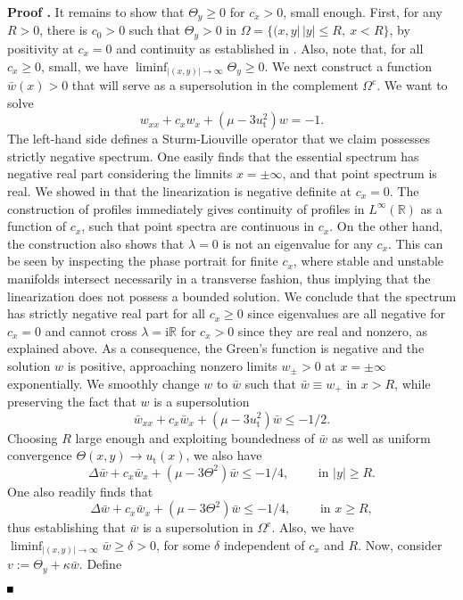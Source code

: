 \documentclass[10pt]{article}
\newenvironment{Proof}[1][\unskip]%
 {\begin{trivlist} \item[]{\bf Proof #1. }}%
 {\hspace*{\fill}$\rule{.4\baselineskip}{.4\baselineskip}$\end{trivlist}}
\newcommand{\R}{\mathbb{R}}
\newcommand{\rmi}{\mathrm{i}}
\renewcommand{\leq}{\leqslant}
\renewcommand{\geq}{\geqslant}
\begin{document}
\begin{Proof}
It remains to show that $\Theta_y\geq 0$ for $c_x>0$, small enough. First, for any $R>0$, there is $c_0>0$ such that $\Theta_y>0$ in $\Omega=\{(x,y|\,|y|\leq R,\ x<R\}$, by positivity at $c_x=0$ and continuity as established in \cite{Monteiro_Scheel}. Also, note that, for all $c_x\geq 0$, small, we have  $\liminf_{|(x,y)|\to\infty} \Theta_y \geq 0$. We next construct a function $\bar{w}(x)>0$ that will serve as a supersolution in the complement $\Omega^\mathrm{c}$. We want to solve 
\[
w_{xx}+c_xw_x+(\mu-3u_\mathrm{t}^2)w=-1.
\]
The left-hand side defines a Sturm-Liouville operator that we claim possesses strictly negative spectrum. One easily finds that the essential spectrum has negative real part considering the limnits $x=\pm\infty$, and that point spectrum is real. We showed in \cite{Monteiro_Scheel} that the linearization is negative definite at $c_x=0$. The construction of profiles immediately gives continuity of profiles in $L^\infty(\R)$ as a function of $c_x$, such that point spectra are continuous in $c_x$. On the other hand, the construction also shows that $\lambda=0$ is not an eigenvalue for any $c_x$. This can be seen by inspecting the phase portrait for finite $c_x$, where stable and unstable manifolds intersect necessarily in a transverse fashion, thus implying that the linearization does not possess a bounded solution.  We conclude that the spectrum has strictly negative real part for all $c_x\geq 0$ since eigenvalues are all negative for $c_x=0$ and cannot cross $\lambda=\rmi\R$ for $c_x>0$ since they are real and nonzero, as explained above. 
As a consequence, the Green's function is negative and the solution $w$ is positive, approaching  nonzero limits $w_\pm>0$ at $x=\pm\infty$ exponentially. We smoothly change $w$ to $\bar{w}$ such that  $\bar{w}\equiv w_+$ in $x>R$, while preserving the fact that $w$ is a supersolution
\[
\bar{w}_{xx}+c_x\bar{w}_x+(\mu-3u_\mathrm{t}^2)\bar{w}\leq -1/2.
\]
Choosing $R$ large enough and exploiting boundedness of $\bar{w}$ as well as uniform convergence $\Theta(x,y)\to u_\mathrm{t}(x)$, we also have 
\[
\Delta\bar{w}+c_x\bar{w}_x+(\mu-3\Theta^2)\bar{w}\leq -1/4,\qquad \text{ in } |y|\geq R.
\]
One also readily finds that 
\begin{equation}\label{e:bw}
\Delta\bar{w}+c_x\bar{w}_x+(\mu-3\Theta^2)\bar{w}\leq -1/4,\qquad \text{ in } x\geq R,
\end{equation}
thus establishing that $\bar{w}$ is a supersolution in $\Omega^\mathrm{c}$. Also, we have $\liminf_{|(x,y)|\to\infty} \bar{w} \geq \delta>0$, for some $\delta$ independent of $c_x$ and $R$. Now, consider $v:=\Theta_y+\kappa\bar{w}$. Define 

\end{Proof}
\end{document}
